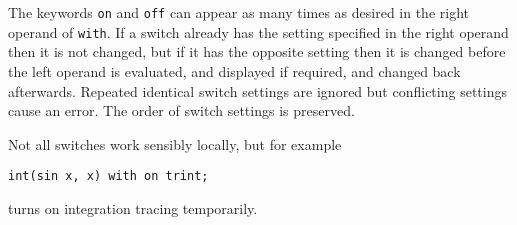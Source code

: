 The keywords \texttt{on} and \texttt{off} can appear as many times as
desired in the right operand of \texttt{with}.  If a switch already
has the setting specified in the right operand then it is not changed,
but if it has the opposite setting then it is changed before the left
operand is evaluated, and displayed if required, and changed back
afterwards.  Repeated identical switch settings are ignored but
conflicting settings cause an error.  The order of switch settings is
preserved.

Not all switches work sensibly locally, but for example
\begin{verbatim}
int(sin x, x) with on trint;
\end{verbatim}
turns on integration tracing temporarily.
